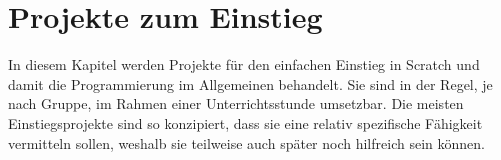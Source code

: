 \chapter {Projekte zum Einstieg}

In diesem Kapitel werden Projekte für den einfachen Einstieg in Scratch und damit die Programmierung im Allgemeinen behandelt. Sie sind in der Regel, je nach Gruppe, im Rahmen einer Unterrichtsstunde umsetzbar.
Die meisten Einstiegsprojekte sind so konzipiert, dass sie eine relativ spezifische Fähigkeit vermitteln sollen, weshalb sie teilweise auch später noch hilfreich sein können.


